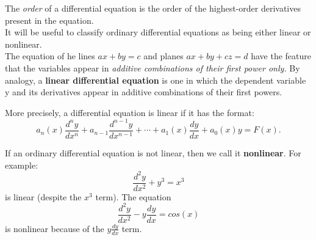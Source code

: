 \documentclass[11pt]{article}
\begin{document}
The \textit{order} of a differential equation is the order of the highest-order derivatives present in the equation.\\

It will be useful to classify ordinary differential equations as being either linear or nonlinear.\\

The equation of he lines $ax+by=c$ and planes $ ax+by+cz=d$ have the feature that the variables appear in \textit{additive combinations of their first power only.} By analogy, a \textbf{linear differential equation} is one in which the dependent variable y and its derivatives appear in additive combinations of their first powers.

More precisely, a differential equation is linear if it has the format:
\[
a_n(x) \frac{d^{n}y}{dx^{n}} + a_{n-1} \frac{d^{n-1}y}{dx^{n-1}} + \cdots + a_{1}(x) \frac{dy}{dx}+a_{0}(x)y = F(x).
\]

If an ordinary differential equation is not linear, then we call it \textbf{nonlinear}. For example:
\[
\frac{d^{2}y}{dx^{2}} + y^{3}=x^{3}
\]
is linear (despite the $x^{3}$ term). The equation
\[
\frac{d^{2}y}{dx^{2}} -y \frac{dy}{dx}=cos(x)
\]
is nonlinear because of the $y \frac{dy}{dx}$ term.

\newpage
\end{document}
